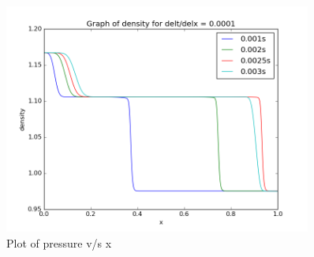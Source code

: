 \documentclass[11pt, a4paper]{article}
\begin{document}
\begin{figure}[H]
 \centering
 \includegraphics[width = 0.9\textwidth]{FTCS2_1_1.png}
 \caption{Plot of pressure v/s x}
\end{figure}
\end{document}
